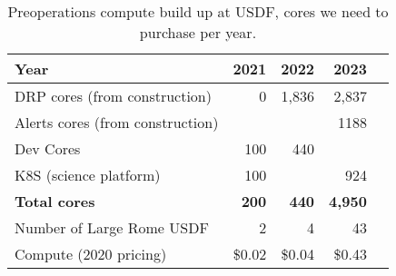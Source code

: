 \tiny \begin{longtable} { |p{}  |r  |r  |r  |r |} 
\caption{Preoperations compute build up at USDF, cores we need to purchase per year. \label{tab:preCompute}}\\ 
\hline 
\textbf{Year}&\textbf{2021}&\textbf{2022}&\textbf{2023} \\ \hline
{DRP cores (from construction)}&{0}&{1,836}&{2,837} \\ \hline
{Alerts cores (from construction)}&{}&{}&{1188} \\ \hline
{Dev Cores}&{100}&{440}& \\ \hline
{K8S (science platform)}&{100}&{}&{924} \\ \hline
\textbf{Total cores}&\textbf{200}&\textbf{440}&\textbf{4,950} \\ \hline
{Number of Large Rome USDF}&{2}&{4}&{43} \\ \hline
{Compute (2020 pricing)}&{\$0.02}&{\$0.04}&{\$0.43} \\ \hline
\end{longtable} \normalsize
